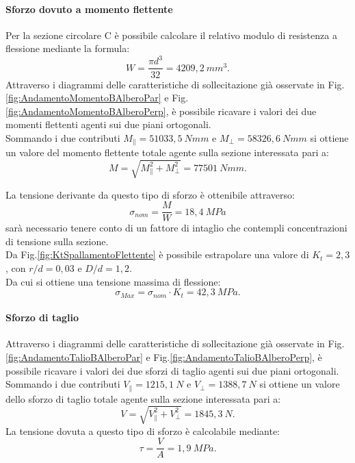 \paragraph{Sforzo dovuto a momento flettente} Per la sezione circolare C è possibile calcolare il relativo modulo di resistenza a flessione mediante la formula:
\begin{equation}
    W=\frac{\pi d^3}{32}=4209,2\ mm^3.
    \label{W_C}
\end{equation}
Attraverso i diagrammi delle caratteristiche di sollecitazione già osservate in Fig.\ref{fig:AndamentoMomentoBAlberoPar} e Fig.\ref{fig:AndamentoMomentoBAlberoPerp}, è possibile ricavare i valori dei due momenti flettenti agenti sui due piani ortogonali.\\ 
Sommando i due contributi $M_{\parallel}=51033,5\ Nmm$ e $M_{\perp}=58326,6\ Nmm$ si ottiene un valore del momento flettente totale agente sulla sezione interessata pari a:
\begin{equation}
    M=\sqrt{M_{\parallel}^2+M_{\perp}^2}=77501\ Nmm.
\end{equation}

La tensione derivante da questo tipo di sforzo è ottenibile attraverso:
\begin{equation}
    \sigma_{nom}=\frac{M}{W}=18,4\ MPa
\end{equation}
sarà necessario tenere conto di un fattore di intaglio che contempli concentrazioni di tensione sulla sezione. \\
Da Fig.\ref{fig:KtSpallamentoFlettente} è possibile estrapolare una valore di $K_t=2,3$, con $r/d=0,03$ e $D/d=1,2$. \\
Da cui si ottiene una tensione massima di flessione:
 \begin{equation}
     \sigma_{Max}=\sigma_{nom}\cdot K_t= 42,3\ MPa.
 \end{equation}
 \paragraph{Sforzo di taglio}
 Attraverso i diagrammi delle caratteristiche di sollecitazione già osservate in Fig.\ref{fig:AndamentoTalioBAlberoPar} e Fig.\ref{fig:AndamentoTalioBAlberoPerp}, è possibile ricavare i valori dei due sforzi di taglio agenti sui due piani ortogonali.\\ 
Sommando i due contributi $V_{\parallel}=1215,1\ N$ e $V_{\perp}=1388,7\ N$ si ottiene un valore dello sforzo di taglio totale agente sulla sezione interessata pari a:
\begin{equation}
    V=\sqrt{V_{\parallel}^2+V_{\perp}^2}=1845,3\ N.
\end{equation}
La tensione dovuta a questo tipo di sforzo è calcolabile mediante:
\begin{equation}
    \tau=\frac{V}{A}=1,9\ MPa.
\end{equation}


